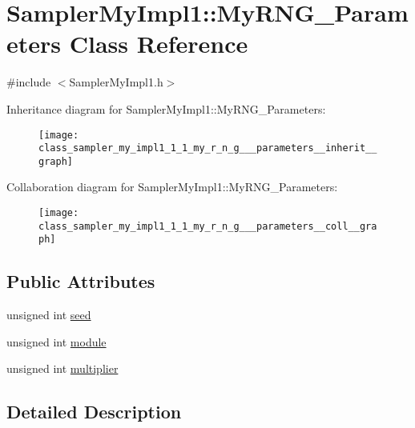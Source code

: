 \hypertarget{class_sampler_my_impl1_1_1_my_r_n_g___parameters}{\section{Sampler\-My\-Impl1\-:\-:My\-R\-N\-G\-\_\-\-Parameters Class Reference}
\label{class_sampler_my_impl1_1_1_my_r_n_g___parameters}
}


{\ttfamily \#include $<$Sampler\-My\-Impl1.\-h$>$}



Inheritance diagram for Sampler\-My\-Impl1\-:\-:My\-R\-N\-G\-\_\-\-Parameters\-:\nopagebreak
\begin{figure}[H]
\begin{center}
\leavevmode
\texttt{[image: class\_sampler\_my\_impl1\_1\_1\_my\_r\_n\_g\_\_\_parameters\_\_inherit\_\_graph]}
\end{center}
\end{figure}


Collaboration diagram for Sampler\-My\-Impl1\-:\-:My\-R\-N\-G\-\_\-\-Parameters\-:\nopagebreak
\begin{figure}[H]
\begin{center}
\leavevmode
\texttt{[image: class\_sampler\_my\_impl1\_1\_1\_my\_r\_n\_g\_\_\_parameters\_\_coll\_\_graph]}
\end{center}
\end{figure}
\subsection*{Public Attributes}
\begin{DoxyCompactItemize}
\item 
unsigned int \hyperlink{class_sampler_my_impl1_1_1_my_r_n_g___parameters_a4fd3cd31977ef5d606d31d2d68def258}{seed}
\item 
unsigned int \hyperlink{class_sampler_my_impl1_1_1_my_r_n_g___parameters_a7e4c25cb935ac5ecd7732028dbe4541f}{module}
\item 
unsigned int \hyperlink{class_sampler_my_impl1_1_1_my_r_n_g___parameters_a5038aa739c1c072931154d7d8c1a8cb0}{multiplier}
\end{DoxyCompactItemize}


\subsection{Detailed Description}


